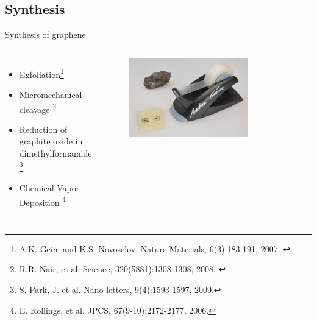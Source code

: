 \documentclass{beamer}
\begin{document}


\subsection{Synthesis}

\begin{frame}

\vspace{-0.2cm}

\noindent\makebox[\linewidth]{\rule{\linewidth}{0.4pt}}

\vspace{-2.0mm}
\begin{center}
{\huge Synthesis of graphene}
\end{center}

\vspace{-6mm}
\noindent\makebox[\linewidth]{\rule{\linewidth}{0.4pt}}

\begin{columns}
\begin{itemize}

\item Exfoliation\footnote[frame]{\tiny A.K. Geim and K.S. Novoselov. Nature
Materials, 6(3):183-191, 2007. \label{ft:geimNAT07}}

\item Micromechanical cleavage
\footnote[frame]{\tiny R.R. Nair, et al. Science, 320(5881):1308-1308, 2008.
\label{ft:nairSC08}}


\item Reduction of graphite oxide in dimethylformamide
\footnote[frame]{\tiny S. Park, J. et al. Nano letters, 9(4):1593-1597, 2009.}

\item Chemical Vapor Deposition
\footnote[frame]{\tiny E. Rollings, et al. JPCS,
67(9-10):2172-2177, 2006.}

\end{itemize}
\begin{figure}
\centering
\includegraphics[width=0.75\textwidth]{figs/tools.png}


\end{figure}
\end{columns}
\end{frame}
\end{document}
